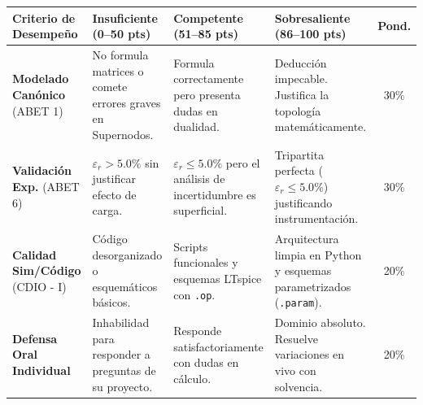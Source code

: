 \documentclass[11pt, a4paper]{article}
\begin{document}
\vspace{0.3cm}
\begin{table}[h!]
    \centering
    \footnotesize
    \renewcommand{\arraystretch}{1.5}
    \begin{tabularx}{\textwidth}{@{}p{3.5cm} >{\raggedright\arraybackslash}X >{\raggedright\arraybackslash}X >{\raggedright\arraybackslash}X c@{}}
        \toprule
        \rowcolor{ucbblue!10}
        \textbf{Criterio de Desempeño} & \textbf{Insuficiente (0–50 pts)} & \textbf{Competente (51–85 pts)} & \textbf{Sobresaliente (86–100 pts)} & \textbf{Pond.} \\
        \midrule
        \textbf{Modelado Canónico} (ABET 1) & No formula matrices o comete errores graves en Supernodos. & Formula correctamente pero presenta dudas en dualidad. & Deducción impecable. Justifica la topología matemáticamente. & 30\% \\
        \textbf{Validación Exp.} (ABET 6) & $\varepsilon_r > 5.0\%$ sin justificar efecto de carga. & $\varepsilon_r \le 5.0\%$ pero el análisis de incertidumbre es superficial. & Tripartita perfecta ($\varepsilon_r \le 5.0\%$) justificando instrumentación. & 30\% \\
        \textbf{Calidad Sim/Código} (CDIO - I) & Código desorganizado o esquemáticos básicos. & Scripts funcionales y esquemas LTspice con \texttt{.op}. & Arquitectura limpia en Python y esquemas parametrizados (\texttt{.param}). & 20\% \\
        \textbf{Defensa Oral Individual} & Inhabilidad para responder a preguntas de su proyecto. & Responde satisfactoriamente con dudas en cálculo. & Dominio absoluto. Resuelve variaciones en vivo con solvencia. & 20\% \\
        \bottomrule
    \end{tabularx}
\end{table}
\end{document}
